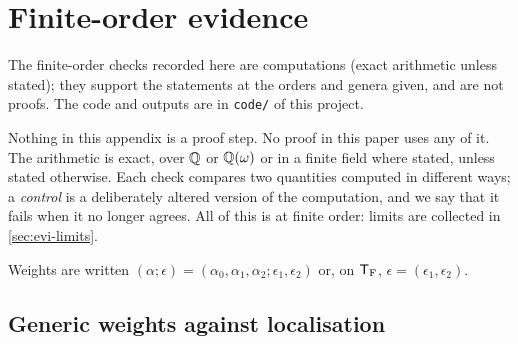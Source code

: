 \section{Finite-order evidence}
\label{sec:evi}
\noindent{} The finite-order checks recorded here are computations (exact arithmetic unless stated); they support the statements at the orders and genera given, and are not proofs. The code and outputs are in \texttt{code/} of this project.

\begingroup\sloppy

Nothing in this appendix is a proof step. No proof in this paper uses any of it. The arithmetic is exact, over $\mathbb{Q}$ or $\mathbb{Q}(\omega)$ or in a finite field where stated, unless stated otherwise. Each check compares two quantities computed in different ways; a \emph{control} is a deliberately altered version of the computation, and we say that it fails when it no longer agrees. All of this is at finite order: limits are collected in \cref{sec:evi-limits}.

Weights are written $(\alpha;\epsilon)=(\alpha_0,\alpha_1,\alpha_2;\epsilon_1,\epsilon_2)$ or, on $\mathsf{T}_{\mathrm{F}}$, $\epsilon=(\epsilon_1,\epsilon_2)$.

\subsection{Generic weights against localisation}
\label{sec:evi-gen}

